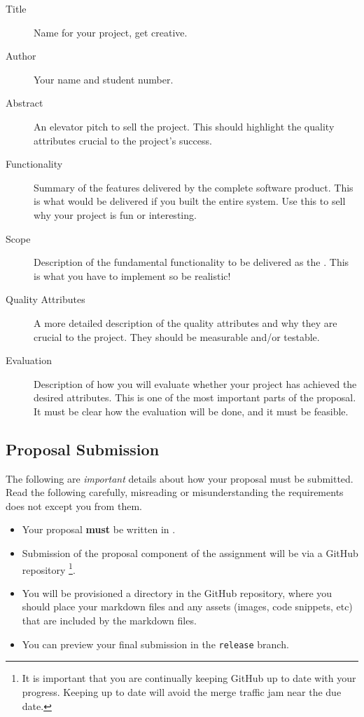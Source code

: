\documentclass{csse4400}
\begin{document}
\begin{description}
    \item[Title] Name for your project, get creative.
    \item[Author] Your name and student number.
    \item[Abstract] An elevator pitch to sell the project. This should highlight the quality attributes crucial to the project's success.
    \item[Functionality] Summary of the features delivered by the complete software product. This is what would be delivered if you built the entire system.
                                    Use this to sell why your project is fun or interesting.
    \item[Scope] Description of the fundamental functionality to be delivered as the .
                         This is what you have to implement so be realistic!
    \item[Quality Attributes] A more detailed description of the quality attributes and why they are crucial to the project.
                                            They should be measurable and/or testable.
    \item[Evaluation] Description of how you will evaluate whether your project has achieved the desired attributes.
                                This is one of the most important parts of the proposal.
                                It must be clear how the evaluation will be done, and it must be feasible.
\end{description}


\subsection{Proposal Submission}

The following are \emph{important} details about how your proposal must be submitted.
Read the following carefully, misreading or misunderstanding the requirements does not except you from them.

\begin{itemize}
    \item Your proposal \textbf{must} be written in .
    \item Submission of the proposal component of the assignment will be via a GitHub repository%
             \footnote{It is important that you are continually keeping GitHub up to date with your progress.
              Keeping up to date will avoid the merge traffic jam near the due date.}.
    \item You will be provisioned a directory in the GitHub repository,
             where you should place your markdown files and any assets (images, code snippets, etc) that are included by the markdown files.
    \item You can preview your final submission in the \texttt{release} branch.
\end{itemize}
\end{document}
